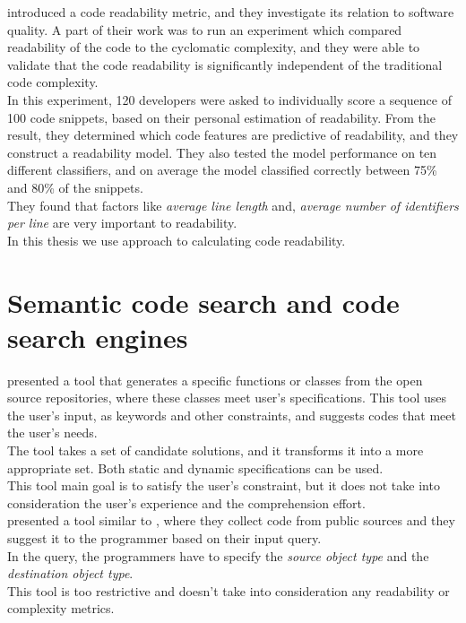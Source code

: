 \documentclass[12pt,mscthesis]{usiinfthesis}
\begin{document}
	\citet{Buse2010} introduced a code readability metric, and they investigate its relation to software quality. A part of their work was to run an experiment which compared readability of the code to the cyclomatic complexity, and they were able to validate that the code readability is significantly independent of the traditional code complexity.\\
	In this experiment, 120 developers were asked to individually score a sequence of 100 code snippets, based on their personal estimation of readability. From the result, they determined which code features are predictive of readability, and they construct a readability model. They also tested the model performance on ten different classifiers, and on average the model classified correctly between 75\% and 80\% of the snippets.\\
	They found that factors like \textit{average line length} and, \textit{average number of identifiers per line} are very important to readability.\\
	In this thesis we use \citet{Buse2010} approach to calculating code readability.

	\section{Semantic code search and code search engines }

	\citet{Reiss:2009:SCS:1555001.1555040} presented a tool that generates a specific functions or classes from the open source repositories, where these classes meet user's specifications. This tool uses the user's input, as keywords and other constraints, and suggests codes that meet the user's needs.\\
	The tool takes a set of candidate solutions, and it transforms it into a more appropriate set. Both static and dynamic specifications can be used.\\
	This tool main goal is to satisfy the user's constraint, but it does not take into consideration the user's experience and the comprehension effort.\\
	

	\citet{Thummalapenta:2007:PPA:1321631.1321663} presented a tool similar to \citet{Reiss:2009:SCS:1555001.1555040}, where they collect code from public sources and they suggest it to the programmer based on their input query.\\ In the query, the programmers have to specify the \textit{source object type} and the \textit{destination object type}.\\ This tool is too restrictive and doesn't take into consideration any readability or complexity metrics.\\
\end{document}
